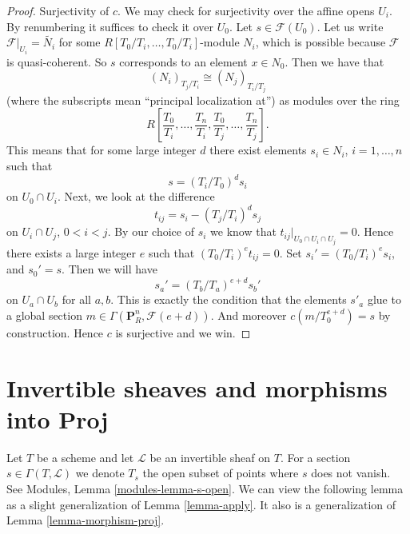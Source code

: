\begin{proof}
\medskip\noindent
Surjectivity of $c$. We may check for surjectivity over the affine opens
$U_i$. By renumbering it suffices to check it over $U_0$.
Let $s \in \mathcal{F}(U_0)$.
Let us write $\mathcal{F}|_{U_i} = \widetilde{N_i}$ for some
$R[T_0/T_i, \ldots, T_0/T_i]$-module $N_i$, which is possible because
$\mathcal{F}$ is quasi-coherent. So $s$ corresponds to an element
$x \in N_0$. Then we have that
$$
(N_i)_{T_j/T_i} \cong (N_j)_{T_i/T_j}
$$
(where the subscripts mean ``principal localization at'')
as modules over the ring
$$
R\left[
\frac{T_0}{T_i}, \ldots, \frac{T_n}{T_i},
\frac{T_0}{T_j}, \ldots, \frac{T_n}{T_j}
\right].
$$
This means that for some large integer $d$ there exist elements
$s_i \in N_i$, $i = 1, \ldots, n$ such that
$$
s = (T_i/T_0)^d s_i
$$
on $U_0 \cap U_i$. Next, we look at the difference
$$
t_{ij} = s_i - (T_j/T_i)^d s_j
$$
on $U_i \cap U_j$, $0 < i < j$. By our choice of $s_i$ we know that
$t_{ij}|_{U_0 \cap U_i \cap U_j} = 0$. Hence there exists a large integer
$e$ such that $(T_0/T_i)^et_{ij} = 0$. Set $s_i' = (T_0/T_i)^es_i$,
and $s_0' = s$. Then we will have
$$
s_a' = (T_b/T_a)^{e + d} s_b'
$$
on $U_a \cap U_b$ for all $a, b$. This is exactly the condition that the
elements $s'_a$ glue to a global section
$m \in \Gamma(\mathbf{P}^n_R, \mathcal{F}(e + d))$.
And moreover $c(m/T_0^{e + d}) = s$ by construction. Hence $c$ is
surjective and we win.
\end{proof}










\section{Invertible sheaves and morphisms into Proj}
\label{section-invertible-proj}

\noindent
Let $T$ be a scheme and let $\mathcal{L}$ be an invertible sheaf
on $T$. For a section $s \in \Gamma(T, \mathcal{L})$ we denote
$T_s$ the open subset of points where $s$ does not vanish. See
Modules, Lemma \ref{modules-lemma-s-open}. We can view the following
lemma as a slight generalization of Lemma \ref{lemma-apply}.
It also is a generalization of Lemma \ref{lemma-morphism-proj}.

